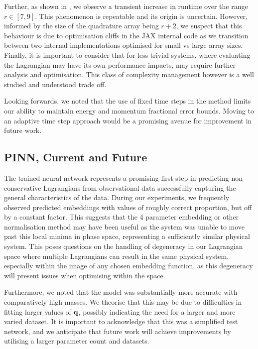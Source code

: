 Further, as shown in , we observe a transient increase in runtime over the range $r \in [7, 9]$. This phenomenon is repeatable and its origin is uncertain. However, informed by the size of the quadrature array being $r + 2$, we suspect that this behaviour is due to optimisation cliffs in the JAX internal code as we transition between two internal implementations optimised for small vs large array sizes. Finally, it is important to consider that for less trivial systems, where evaluating the Lagrangian may have its own performance impacts, may require further analysis and optimisation. This class of complexity management however is a well studied and understood trade off.

Looking forwards, we noted that the use of fixed time steps in the method limits our ability to maintain energy and momentum fractional error bounds. Moving to an adaptive time step approach would be a promising avenue for improvement in future work.

\subsection{PINN, Current and Future}

The trained neural network represents a promising first step in predicting non-conservative Lagrangians from observational data successfully capturing the general characteristics of the data.
During our experiments, we frequently observed predicted embeddings with values of roughly correct proportion, but off by a constant factor. This suggests that the 4 parameter embedding or other normalisation method may have been useful as the system was unable to move past this local minima in phase space, representing a sufficiently similar physical system.
This poses questions on the handling of degeneracy in our Lagrangian space where multiple Lagrangians can result in the same physical system, especially within the image of any chosen embedding function, as this degeneracy will present issues when optimising within the space.

Furthermore, we noted that the model was substantially more accurate with comparatively high masses. We theorise that this may be due to difficulties in fitting larger values of $\vb{q}$, possibly indicating the need for a larger and more varied dataset. It is important to acknowledge that this was a simplified test network, and we anticipate that future work will achieve improvements by utilising a larger parameter count and datasets.

